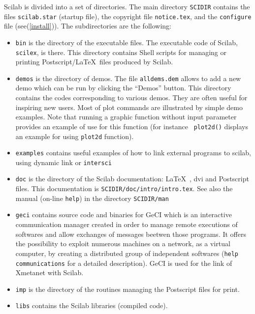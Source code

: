 Scilab is divided into a set of directories. The main directory
\verb!SCIDIR! contains the files {\tt scilab.star} (startup file), the
copyright file {\tt notice.tex}, and the \verb!configure! file
(see(\ref{install})).
The subdirectories are the following:
\begin{itemize}

\item{{\tt bin} is the directory of the executable files.
The executable code of Scilab, {\tt scilex}, is there. 
This directory contains Shell scripts 
for managing or printing Postscript/\LaTeX\  files produced by Scilab.}

\item{{\tt demos} is the directory of demos. The file 
{\tt alldems.dem} allows to add a new demo which can be run by 
clicking the ``Demos'' button. 
This directory contains the codes corresponding
to various demos. They are often useful for inspiring new users.
Most of plot commands are illustrated by simple demo examples. 
Note that running a graphic function without input parameter
provides an example of use for this function (for instance {\tt
plot2d()} displays an example for using {\tt plot2d}  function). }

\item{{\tt examples} contains useful examples of how to link
external programs to scilab, using dynamic link or {\tt intersci}}

\item{{\tt doc} is the directory of the Scilab documentation: \LaTeX\ , dvi 
and Postscript files. 
This documentation is {\tt SCIDIR/doc/intro/intro.tex}. See 
also the manual (on-line {\tt help}) in the directory {\tt SCIDIR/man}}

\item{{\tt geci} contains source code and binaries for GeCI which is an 
interactive communication manager created in order to
manage remote executions of softwares and allow exchanges of messages
beetwen those programs. It offers the possibility to exploit numerous
machines on a network, as a virtual computer, by creating a
distributed group of independent softwares 
(\verb!help communications! for a detailed description).
GeCI is used for the link of Xmetanet with Scilab.}

\item{{\tt imp} is the directory of the routines managing the Postscript files
for print.}

\item{{\tt libs} contains the Scilab libraries (compiled code).}


\end{itemize}
